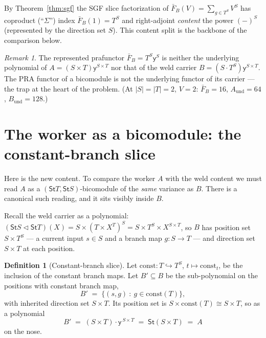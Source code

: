 \documentclass[11pt]{article}
\newcommand{\comp}{\mathbin{\triangleleft}}       %
\newcommand{\St}{\mathsf{St}}                      %
\newcommand{\y}{\mathsf{y}}
\newcommand{\const}{\mathrm{const}}
\theoremstyle{plain}
\theoremstyle{definition}
\newtheorem{definition}{Definition}
\theoremstyle{remark}
\newtheorem{remark}{Remark}
\begin{document}
By Theorem~\ref{thm:sgf} the SGF slice factorization of $\bar F_B(V)=\sum_{g\in T^S}V^S$
has coproduct (``$\Sigma$'') index $\bar F_B(1)=T^S$ and right-adjoint \emph{content} the
power $(-)^S$ (represented by the direction set $S$). This content split is the backbone of
the comparison below.

\begin{remark}
The represented prafunctor $\bar F_B=T^S\y^S$ is neither the underlying polynomial of
$A=(S\times T)\y^{S\times T}$ nor that of the weld carrier $B=(S\cdot T^S)\y^{S\times T}$.
The PRA functor of a bicomodule is not the underlying functor of its carrier --- the trap
at the heart of the problem. (At $|S|=|T|=2$, $V=2$: $\bar F_B=16$, $A_{\mathrm{und}}=64$,
$B_{\mathrm{und}}=128$.)
\end{remark}

\section{The worker as a bicomodule: the constant-branch slice}\label{sec:slice}

Here is the new content. To compare the worker $A$ with the weld content we must read $A$
as a $(\St T,\St S)$-bicomodule of the \emph{same} variance as $B$. There is a canonical
such reading, and it sits visibly inside $B$.

Recall the weld carrier as a polynomial:
$(\St S\comp\St T)(X)=S\times(T\times X^T)^S=S\times T^S\times X^{S\times T}$, so $B$ has
position set $S\times T^S$ --- a current input $s\in S$ and a branch map $g\colon S\to T$
--- and direction set $S\times T$ at each position.

\begin{definition}[Constant-branch slice]\label{def:slice}
Let $\const\colon T\hookrightarrow T^S$, $t\mapsto\const_t$, be the inclusion of the
constant branch maps. Let $B'\subseteq B$ be the sub-polynomial on the positions with
constant branch map,
\[
  B' \;=\; \bigl\{(s,g)\ :\ g\in\const(T)\bigr\},
\]
with inherited direction set $S\times T$. Its position set is $S\times\const(T)\cong S\times
T$, so as a polynomial
\[
  B' \;=\; (S\times T)\cdot\y^{\,S\times T}\;=\;\St(S\times T)\;=\;A
\]
on the nose.
\end{definition}
\end{document}
